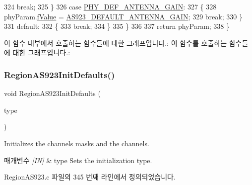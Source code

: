 \begin{DoxyCode}
324             \textcolor{keywordflow}{break};
325         \}
326         \textcolor{keywordflow}{case} \mbox{\hyperlink{group___r_e_g_i_o_n_gga51cbe8f5433d914fe9cf81b451de2c2da37b73a543ea79ce58bf18035329ba773}{PHY\_DEF\_ANTENNA\_GAIN}}:
327         \{
328             phyParam.\mbox{\hyperlink{unionu_phy_param_ad30735f839c3c7592fc5bc5390c45715}{fValue}} = \mbox{\hyperlink{group___r_e_g_i_o_n_a_s923_ga4a2faf56603f9d0feb2c105632a5b005}{AS923\_DEFAULT\_ANTENNA\_GAIN}};
329             \textcolor{keywordflow}{break};
330         \}
331         \textcolor{keywordflow}{default}:
332         \{
333             \textcolor{keywordflow}{break};
334         \}
335     \}
336 
337     \textcolor{keywordflow}{return} phyParam;
338 \}
\end{DoxyCode}
이 함수 내부에서 호출하는 함수들에 대한 그래프입니다.\+:
이 함수를 호출하는 함수들에 대한 그래프입니다.\+:
\mbox{\label{group___r_e_g_i_o_n_a_s923_ga24e0f9bd2b50e0a8efb5e3d5ecc12904}} 
\subsubsection{\texorpdfstring{Region\+A\+S923\+Init\+Defaults()}{RegionAS923InitDefaults()}}
{\footnotesize\ttfamily void Region\+A\+S923\+Init\+Defaults (\begin{DoxyParamCaption}\item[{\mbox{\hyperlink{group___r_e_g_i_o_n_gaddc73ae10673ec925724e7870363bda9}{Init\+Type\+\_\+t}}}]{type }\end{DoxyParamCaption})}



Initializes the channels masks and the channels. 


\begin{DoxyParams}{매개변수}
{\em \mbox{[}\+I\+N\mbox{]}} & type Sets the initialization type. \\
\hline
\end{DoxyParams}


Region\+A\+S923.\+c 파일의 345 번째 라인에서 정의되었습니다.



